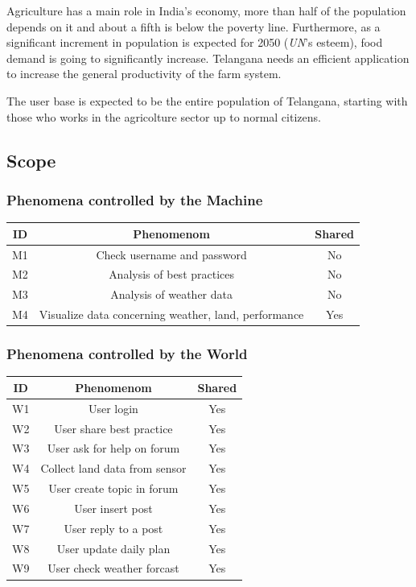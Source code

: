 \documentclass[table, 12pt]{article}
\begin{document}
Agriculture has a main role in India's economy, more than half of the population depends on it and about a fifth is below the poverty line.
Furthermore, as a significant increment in population is expected for 2050 (\emph{UN}'s esteem), food demand is going to significantly increase.
Telangana needs an efficient application to increase the general productivity of the farm system.

The user base is expected to be the entire population of Telangana, starting with those who works in the agricolture sector up to normal citizens.

\subsection{Scope} %
\subsubsection*{Phenomena controlled by the Machine}
\begin{tabular}{|c|c|c|}
    \hline
    \textbf{ID} & \textbf{Phenomenom} & \textbf{Shared} \\\hline\hline
    M1 & Check username and password & No \\\hline
    M2 & Analysis of best practices & No\\\hline
    M3 & Analysis of weather data & No \\\hline
    M4 & Visualize data concerning weather, land, performance & Yes\\\hline
    \hline
\end{tabular}

\subsubsection*{Phenomena controlled by the World}
\begin{center}
    \begin{tabular}{|c|c|c|}
        \hline
        \textbf{ID} & \textbf{Phenomenom} & \textbf{Shared} \\\hline\hline
        W1 & User login & Yes\\\hline
        W2 & User share best practice & Yes\\\hline
        W3 & User ask for help on forum & Yes\\\hline
        W4 & Collect land data from sensor & Yes\\\hline
        W5 & User create topic in forum & Yes\\\hline 
        W6 & User insert post & Yes\\\hline
        W7 & User reply to a post & Yes \\\hline
        W8 & User update daily plan & Yes\\\hline
        W9 & User check weather forcast & Yes\\\hline
        \hline
    \end{tabular}
\end{center}
\end{document}
